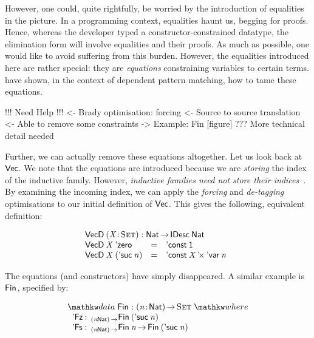 However, one could, quite rightfully, be worried by the introduction
of equalities in the picture. In a programming context, equalities
haunt us, begging for proofs. Hence, whereas the developer typed a
constructor-constrained datatype, the elimination form will involve
equalities and their proofs. As much as possible, one would like to
avoid suffering from this burden. However, the equalities introduced
here are rather special: they are \emph{equations} constraining
variables to certain terms. \citet{goguen:pattern-matching} have
shown, in the context of dependent pattern matching, how to tame these
equations.

\begin{wstructure}
!!! Need Help !!!
<- Brady optimisation: forcing
    <- Source to source translation
    <- Able to remove some constraints
    -> Example: Fin [figure]
    ??? More technical detail needed
\end{wstructure}

Further, we can actually remove these equations altogether. Let us
look back at $\D{Vec}$. We note that the equations are introduced
because we are \emph{storing} the index of the inductive family.
However, \emph{inductive families need not store their
  indices}~\cite{brady:index-inductive-families}.  By examining the
incoming index, we can apply the \emph{forcing} and \emph{de-tagging}
optimisations to our initial definition of $\D{Vec}$. This gives the
following, equivalent definition:

\[\stk{
\VecD \:\PITEL{\V{X}}{\Set} : \Nat \To \IDesc{\Nat} \\
\begin{array}{@{}lll}
\VecD\:\V{X}\: \NatZero     & = & \DConst{\Unit} \\
\VecD\:\V{X}\: (\NatSuc{\V{n}}) & = & \DProd{\DConst{\V{X}}}{\DVar{\V{n}}}
\end{array}
                                       
}\]

The equations (and constructors) have simply disappeared. A similar
example is $\Fin{\!}$, specified by:

\[
\stk{
\data \Fin{\!} : \PI{\V{n}}{\Nat} \Set \where \\
\;\;\begin{array}{@{}l@{\::\:\:}l@{\quad}l}
    \FinZero      & _{\PI{\V{n}}{\Nat}}\Fin{(\NatSuc{\V{n}})}   \\
    \FinSuc{\!}   & _{\PI{\V{n}}{\Nat}}\Fin{\V{n}} \To \Fin{(\NatSuc{\V{n}})}
\end{array}
}\]

